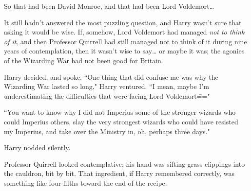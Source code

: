 So that had been David Monroe, and that had been Lord Voldemort{\ldots}

It still hadn't answered the most puzzling question, and Harry wasn't sure that asking it would be wise. If, somehow, Lord Voldemort had managed \emph{not to think of it}, and then Professor Quirrell had still managed not to think of it during nine years of contemplation, then it wasn't wise to say{\ldots} or maybe it was; the agonies of the Wizarding War had not been good for Britain.

Harry decided, and spoke. ``One thing that did confuse me was why the Wizarding War lasted so long," Harry ventured. ``I mean, maybe I'm underestimating the difficulties that were facing Lord Voldemort\==="

``You want to know why I did not Imperius some of the stronger wizards who could Imperius others, slay the very strongest wizards who could have resisted my Imperius, and take over the Ministry in, oh, perhaps three days."

Harry nodded silently.

Professor Quirrell looked contemplative; his hand was sifting grass clippings into the cauldron, bit by bit. That ingredient, if Harry remembered correctly, was something like four-fifths toward the end of the recipe.

